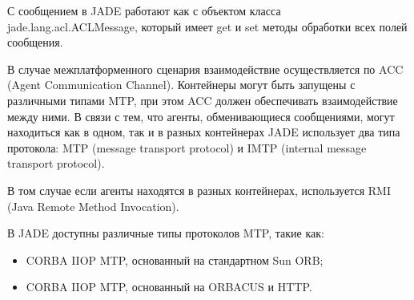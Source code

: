 С сообщением в JADE работают как с объектом класса jade.lang.acl.ACLMessage, который имеет get и set методы обработки всех полей сообщения.

В случае межплатформенного сценария взаимодействие осуществляется по ACC (Agent Communication Channel). Контейнеры могут быть запущены с различными типами MTP, при этом ACC должен обеспечивать взаимодействие между ними.
В связи с тем, что агенты, обменивающиеся сообщениями, могут находиться как в одном, так и в разных контейнерах JADE использует два типа протокола: MTP (message transport protocol) и IMTP (internal message transport protocol).

В том случае если агенты находятся в разных контейнерах, используется RMI (Java Remote Method Invocation).

В JADE доступны различные типы протоколов MTP, такие как:
\begin{itemize}
\item CORBA IIOP MTP, основанный на стандартном Sun ORB;
\item CORBA IIOP MTP, основанный на ORBACUS и HTTP.
\end{itemize}

